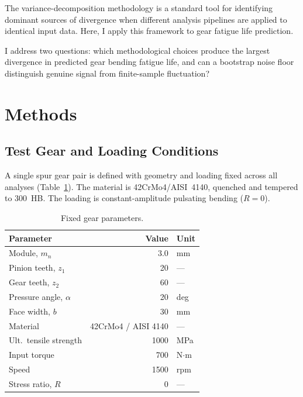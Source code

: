 \documentclass[12pt,a4paper]{article}
\begin{document}
The variance-decomposition methodology is a standard tool for identifying
dominant sources of divergence when different analysis pipelines are
applied to identical input data. Here, I apply this framework to
gear fatigue life prediction.

I address two questions: which methodological choices produce the
largest divergence in predicted gear bending fatigue life, and can a
bootstrap noise floor distinguish genuine signal from finite-sample
fluctuation?

\section{Methods}
\label{sec:methods}

\subsection{Test Gear and Loading Conditions}

A single spur gear pair is defined with geometry and loading fixed
across all analyses (Table~\ref{tab:gear}). The material is
42CrMo4/AISI~4140, quenched and tempered to 300~HB. The loading is
constant-amplitude pulsating bending ($R=0$).

\begin{table}[h]
\centering
\caption{Fixed gear parameters.}
\label{tab:gear}
\begin{tabular}{p{4.5cm} r l}
\toprule
Parameter & Value & Unit \\
\midrule
Module, $m_n$ & 3.0 & mm \\
Pinion teeth, $z_1$ & 20 & --- \\
Gear teeth, $z_2$ & 60 & --- \\
Pressure angle, $\alpha$ & 20 & deg \\
Face width, $b$ & 30 & mm \\
Material & 42CrMo4 / AISI 4140 & --- \\
Ult.\ tensile strength & 1000 & MPa \\
Input torque & 700 & N$\cdot$m \\
Speed & 1500 & rpm \\
Stress ratio, $R$ & 0 & --- \\
\bottomrule
\end{tabular}
\end{table}
\end{document}
